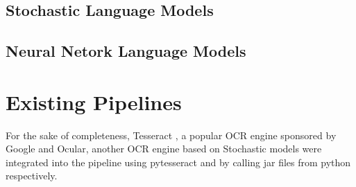 \subsection{Stochastic Language Models}

\subsection{Neural Netork Language Models}


\section{Existing Pipelines}

For the sake of completeness, Tesseract \cite{SmithTesseract}, a popular OCR engine sponsored by Google \cite{Vincent} and Ocular, another OCR engine based on Stochastic models were integrated into the pipeline using pytesseract \cite{Lee} and by calling jar files from python respectively.

